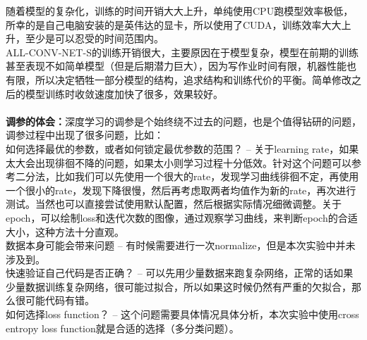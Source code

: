 \documentclass[a4paper,UTF8]{article}
\numberwithin{equation}{section}
\begin{document}
\begin{enumerate}
随着模型的复杂化，训练的时间开销大大上升，单纯使用CPU跑模型效率极低，所幸的是自己电脑安装的是英伟达的显卡，所以使用了CUDA，训练效率大大上升，至少是可以忍受的时间范围内。\\
ALL-CONV-NET-S的训练开销很大，主要原因在于模型复杂，模型在前期的训练甚至表现不如简单模型（但是后期潜力巨大），因为写作业时间有限，机器性能也有限，所以决定牺牲一部分模型的结构，追求结构和训练代价的平衡。简单修改之后的模型训练时收敛速度加快了很多，效果较好。\\\\
\textbf{调参的体会：}深度学习的调参是个始终绕不过去的问题，也是个值得钻研的问题，调参过程中出现了很多问题，比如：\\
如何选择最优的参数，或者如何锁定最优参数的范围？ -- 关于learning rate，如果太大会出现徘徊不降的问题，如果太小则学习过程十分低效。针对这个问题可以参考二分法，比如我们可以先使用一个很大的rate，发现学习曲线徘徊不定，再使用一个很小的rate，发现下降很慢，然后再考虑取两者均值作为新的rate，再次进行测试。当然也可以直接尝试使用默认配置，然后根据实际情况细微调整。关于epoch，可以绘制loss和迭代次数的图像，通过观察学习曲线，来判断epoch的合适大小，这种方法十分直观。\\
数据本身可能会带来问题 -- 有时候需要进行一次normalize，但是本次实验中并未涉及到。\\
快速验证自己代码是否正确？ -- 可以先用少量数据来跑复杂网络，正常的话如果少量数据训练复杂网络，很可能过拟合，所以如果这时候仍然有严重的欠拟合，那么很可能代码有错。\\
如何选择loss function？ -- 这个问题需要具体情况具体分析，本次实验中使用cross entropy loss function就是合适的选择（多分类问题）。\\


\end{enumerate}
\end{document}
